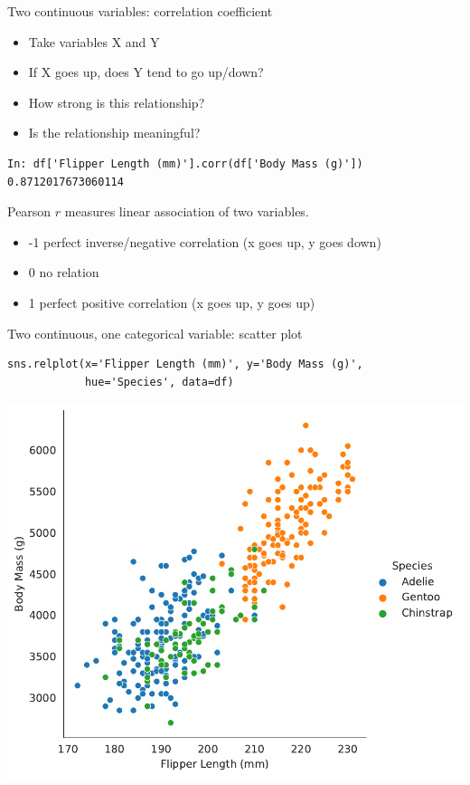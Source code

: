 \documentclass[aspectratio=169,usenames,dvipsnames]{beamer}
\begin{document}
\begin{frame}[fragile]{Two continuous variables: correlation coefficient}
    \begin{itemize}
        \item Take variables X and Y
        \item If X goes up, does Y tend to go up/down?
        \item How strong is this relationship?
        \item Is the relationship meaningful?
    \end{itemize}

\begin{lstlisting}
In: df['Flipper Length (mm)'].corr(df['Body Mass (g)'])
0.8712017673060114
\end{lstlisting}

\pause\vspace{1em}
Pearson $r$ measures linear association of two variables.

\begin{itemize}
    \item -1 perfect inverse/negative correlation (x goes up, y goes down)
    \item 0 no  relation
    \item 1 perfect positive correlation (x goes up, y goes up)
\end{itemize}

\end{frame}


\begin{frame}[fragile]{Two continuous, one categorical variable: scatter plot}
\vspace{-0.5em}
\begin{lstlisting}
sns.relplot(x='Flipper Length (mm)', y='Body Mass (g)',
            hue='Species', data=df)
\end{lstlisting}

\includegraphics[height=0.7\textheight]{fig/scatterpenguins1}
\end{frame}
\end{document}
